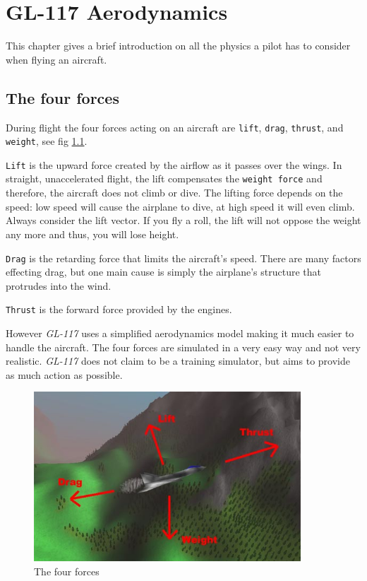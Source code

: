 \chapter{GL-117 Aerodynamics}
\label{chap:aerodynamics}

This chapter gives a brief introduction on all the physics
a pilot has to consider when flying an aircraft.

\section{The four forces}
\label{sec:forces}

During flight the four forces acting on an aircraft are \texttt{lift},
\texttt{drag}, \texttt{thrust}, and \texttt{weight}, see fig \ref{fig:forces}.

\texttt{Lift} is the upward force created by the airflow as it
passes over the wings.
In straight, unaccelerated flight, the lift compensates the
\texttt{weight force} and therefore, the aircraft does not climb or dive.
The lifting force depends on the speed: low speed will cause the
airplane to dive, at high speed it will even climb.
Always consider the lift vector. If you fly a roll, the lift will not
oppose the weight any more and thus, you will lose height.

\texttt{Drag} is the retarding force that limits the aircraft's speed.
There are many factors effecting drag, but one main cause
is simply the airplane's structure that protrudes into the wind.

\texttt{Thrust} is the forward force provided by the engines.

However \emph{GL-117} uses a simplified aerodynamics model making
it much easier to handle the aircraft. The four forces are
simulated in a very easy way and not very realistic. \emph{GL-117}
does not claim to be a training simulator, but aims to provide
as much action as possible.

\begin{figure}
\begin{center}
\includegraphics[width=10cm]{forces.jpg}
\caption{The four forces}
\label{fig:forces}
\end{center}
\end{figure}



